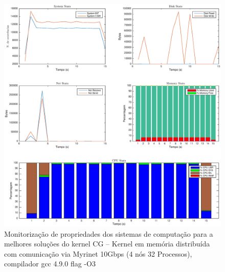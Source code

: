 \documentclass[conference,compsoc]{IEEEtran}
\begin{document}
 \begin{figure}
\centering
\includegraphics[width=\textwidth]{EPS/DSTAT/CG_MPI_MX_GCC.eps}
\caption{Monitorização de propriedades dos sistemas de computação para a melhores soluções do kernel CG -- Kernel em memória distribuída com comunicação via Myrinet 10Gbps (4 nós 32 Processos), compilador gcc 4.9.0 flag -O3}
\label{dstat_cg}
\end{figure}
\end{document}
